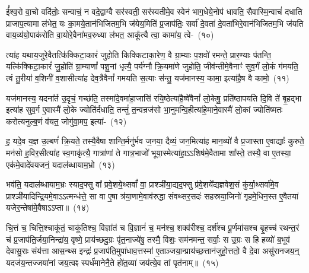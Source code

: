 ई᳚श्व॒रो वा॒चो वदि॑तोः॒ सन्वाचं॒ न वदे॒द्वाग्वै सर॑स्वती॒ सर॑स्वतीमे॒व स्वेन॑ भाग॒धेये॒नोप॑ धावति॒ सैवास्मि॒न्वाचं॑ दधाति प्राजाप॒त्यामा ल॑भेत॒ यः का॒मये॒तान॑भिजितम॒भि ज॑येय॒मिति॑ प्र॒जा\-प॑तिः॒ सर्वा॑ दे॒वता॑ दे॒वता॑भिरे॒वान॑भि\-जितम॒भि ज॑यति वाय॒व्य॑यो॒पा\-क॑रोति वा॒योरे॒वैना॑मव॒रुध्या ल॑भत॒ आकू᳚त्यै त्वा॒ कामा॑य॒ त्वे-~(१०)

त्या॑ह यथाय॒जुरे॒वैतत्कि॑क्किटा॒कारं॑ जुहोति किक्किटाका॒रेण॒ वै ग्रा॒म्याः प॒शवो॑ रमन्ते॒ प्रार॒ण्याः प॑तन्ति॒ यत्कि॑क्किटा॒कारं॑ जु॒होति॑ ग्रा॒म्याणां᳚ पशू॒नां धृत्यै॒ पर्य॑ग्नौ क्रि॒यमा॑णे जुहोति॒ जीव॑न्तीमे॒वैनाꣳ॑ सुव॒र्गं लो॒कं ग॑मयति॒ त्वं तु॒रीया॑ व॒शिनी॑ व॒शासीत्या॑ह देव॒त्रैवैनां᳚ गमयति स॒त्याः स॑न्तु॒ यज॑मानस्य॒ कामा॒ इत्या॑है॒ष वै कामो॒~(११)

यज॑मानस्य॒ यदना᳚र्त उ॒दृचं॒ गच्छ॑ति॒ तस्मा॑दे॒वमा॑हा॒जासि॑ रयि॒ष्ठेत्या॑है॒ष्वे॑वैनां᳚ लो॒केषु॒ प्रति॑\-ष्ठापयति दि॒वि ते॑ बृ॒हद्भा इत्या॑ह सुव॒र्ग ए॒वास्मै॑ लो॒के ज्योति॑र्दधाति॒ तन्तुं॑ त॒न्वन्रज॑सो भा॒नुमन्वि॒ही\-त्या॑\-हे॒माने॒वास्मै॑ लो॒कां ज्योति॑ष्मतः करोत्यनुल्ब॒णं व॑यत॒ जोगु॑वा॒मप॒ इत्या॑-~(१२)

ह॒ यदे॒व य॒ज्ञ उ॒ल्बणं॑ क्रि॒यते॒ तस्यै॒वैषा शान्ति॒र्मनु॑र्भव ज॒नया॒ दैव्यं॒ जन॒मित्या॑ह मान॒व्यो॑ वै प्र॒जास्ता ए॒वाद्याः᳚ कुरुते॒ मन॑सो ह॒विर॒सीत्या॑ह स्व॒गाकृ॑त्यै॒ गात्रा॑णां ते गात्र॒भाजो॑ भूया॒स्मेत्या॑हा॒\-ऽऽ\-\-शिष॑मे॒वैतामा शा᳚स्ते॒ तस्यै॒ वा ए॒तस्या॒ एक॑मे॒वादे॑वयजनं॒ यदाल॑ब्धायाम॒भ्रो~(१३)

भव॑ति॒ यदाल॑ब्धायाम॒भ्रः स्याद॒फ्सु वा᳚ प्रवे॒शये॒थ्सर्वां᳚ वा॒ प्राश्ञी॑या॒द्यद॒फ्सु प्र॑वे॒शये᳚द्यज्ञवेश॒सं कु॑र्या॒थ्सर्वा॑मे॒व प्राश्ञी॑या\-दिन्द्रि॒य\-मे॒वा\-ऽऽ\-त्मन्ध॑त्ते॒ सा वा ए॒षा त्र॑या॒णामे॒वाव॑रुद्धा संवथ्सर॒सदः॑ सहस्रया॒जिनो॑ गृहमे॒धिन॒स्त ए॒वैतया॑ यजेर॒न्तेषा॑\-मे॒वै\-षा\-ऽऽ\-प्ता॥~(१४)

{\anuvakamend[{यथ्स्वेन॑ सारस्व॒तीमा ल॑भेत॒ यः कामा॑य त्वा॒ कामो\-ऽप॒ इत्य॒भ्रो द्विच॑त्वारिꣳशच्च}]}%

चि॒त्तं च॒ चित्ति॒श्चाकू॑तं॒ चाकू॑तिश्च॒ विज्ञा॑तं च वि॒ज्ञानं॑ च॒ मन॑श्च॒ शक्व॑रीश्च॒ दर्\mbox{}श॑श्च पू॒र्णमा॑सश्च बृ॒हच्च॑ रथन्त॒रं च॑ प्र॒जा\-प॑ति॒र्जया॒निन्द्रा॑य॒ वृष्णे॒ प्राय॑च्छदु॒ग्रः पृ॑त॒नाज्ये॑षु॒ तस्मै॒ विशः॒ सम॑नमन्त॒ सर्वाः॒ स उ॒ग्रः स हि हव्यो॑ ब॒भूव॑ देवासु॒राः संय॑त्ता आस॒न्थ्स इन्द्रः॑ प्र॒जा\-प॑ति॒मुपा॑धाव॒त्तस्मा॑ ए॒ताञ्जया॒न्प्राय॑च्छ॒त्तान॑जुहो॒त्ततो॒ वै दे॒वा असु॑रानजय॒न्॒ य\-दज॑य॒न्तज्जया॑नां जय॒त्वꣴ स्पर्ध॑मानेनै॒ते हो॑त॒व्या॑ जय॑त्ये॒व तां पृत॑नाम्॥~(१५)

{\anuvakamend[{उप॒ पञ्च॑विꣳशतिश्च}]}%

